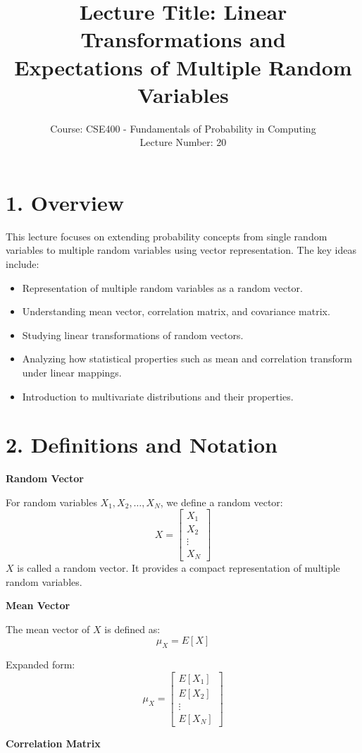 \documentclass[12pt]{article}
\title{\textbf{Lecture Title: Linear Transformations and\\
Expectations of Multiple Random Variables}}
\author{Course: CSE400 - Fundamentals of Probability in Computing\\
Lecture Number: 20}
\date{}
\begin{document}
\maketitle

\section*{1. Overview}
This lecture focuses on extending probability concepts from single random variables to multiple random variables using vector representation. The key ideas include:
\begin{itemize}
\item Representation of multiple random variables as a random vector.
\item Understanding mean vector, correlation matrix, and covariance matrix.
\item Studying linear transformations of random vectors.
\item Analyzing how statistical properties such as mean and correlation transform under linear mappings.
\item Introduction to multivariate distributions and their properties.
\end{itemize}

\section*{2. Definitions and Notation}

\textbf{Random Vector}

For random variables $X_1, X_2, \dots, X_N$, we define a random vector:
\[
X = 
\begin{bmatrix}
X_1 \\
X_2 \\
\vdots \\
X_N
\end{bmatrix}
\]
$X$ is called a random vector. It provides a compact representation of multiple random variables.

\textbf{Mean Vector}

The mean vector of $X$ is defined as:
\[
\mu_X = E[X]
\]

Expanded form:
\[
\mu_X =
\begin{bmatrix}
E[X_1] \\
E[X_2] \\
\vdots \\
E[X_N]
\end{bmatrix}
\]

\textbf{Correlation Matrix}
\end{document}
